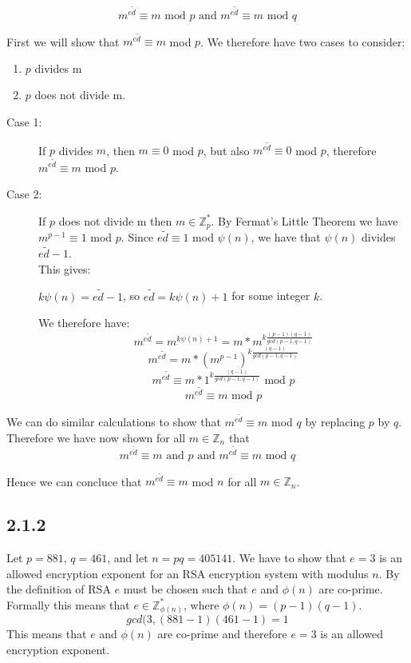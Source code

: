 \documentclass[11pt]{report}
\begin{document}
$$m^{e\tilde{d}} \equiv m \text{ mod } p \text{ and } m^{e\tilde{d}} \equiv m \text{ mod } q$$

First we will show that $m^{e\tilde{d}} \equiv m$ mod $p$. We therefore have two cases to consider:
\begin{enumerate}
	\item $p$ divides m
	\item $p$ does not divide m.
\end{enumerate}

\begin{description}
	\item[Case 1:] If $p$ divides $m$, then $m \equiv 0$ mod $p$, but also $m^{e\tilde{d}} \equiv 0$ mod $p$, therefore $m^{e\tilde{d}} \equiv m$ mod $p$.
	
	\item[Case 2:] If $p$ does not divide m then $m \in \mathbb{Z}^*_p$. By Fermat's Little Theorem we have $m^{p-1} \equiv 1$ mod $p$. Since $e\tilde{d} \equiv 1$ mod $\psi(n)$, we have that $\psi(n)$ divides $e\tilde{d} - 1$.\\
	This gives:
	\begin{center}
		$k \psi(n) = e\tilde{d} - 1$, so $e\tilde{d} = k \psi(n) + 1$ for some integer $k$.
	\end{center}
	We therefore have:
	$$m^{e\tilde{d}} = m^{k\psi(n)+1} = m * m^{k\frac{(p-1)(q-1)}{gcd(p-1,q-1)}}$$
	$$m^{e\tilde{d}} = m * (m^{p-1})^{k\frac{(q-1)}{gcd(p-1,q-1)}}$$
	$$m^{e\tilde{d}} \equiv m * 1^{k\frac{(q-1)}{gcd(p-1,q-1)}} \text{ mod } p$$
	$$m^{e\tilde{d}} \equiv m \text{ mod } p$$
\end{description}

We can do similar calculations to show that $m^{e\tilde{d}} \equiv m$ mod $q$ by replacing $p$ by $q$.\\
Therefore we have now shown for all $m \in \mathbb{Z}_n$ that
$$m^{e\tilde{d}} \equiv m \text{ and } p \text{ and } m^{e\tilde{d}} \equiv m \text{ mod } q$$

Hence we can concluce that $m^{e\tilde{d}} \equiv m$ mod $n$ for all $m \in \mathbb{Z}_{n}$.


\subsection*{2.1.2}
Let $p = 881$, $q = 461$, and let $n = pq = 405141$. We have to show that $e = 3$ is an allowed encryption exponent for an RSA encryption system with modulus $n$. By the definition of RSA $e$ must be chosen such that $e$ and $\phi(n)$ are co-prime. Formally this means that $e \in \mathbb{Z}^*_{\phi(n)}$, where $\phi(n) = (p-1)(q-1)$.
$$gcd(3, (881-1)(461-1) = 1$$
This means that $e$ and $\phi(n)$ are co-prime and therefore $e=3$ is an allowed encryption exponent.
\end{document}

